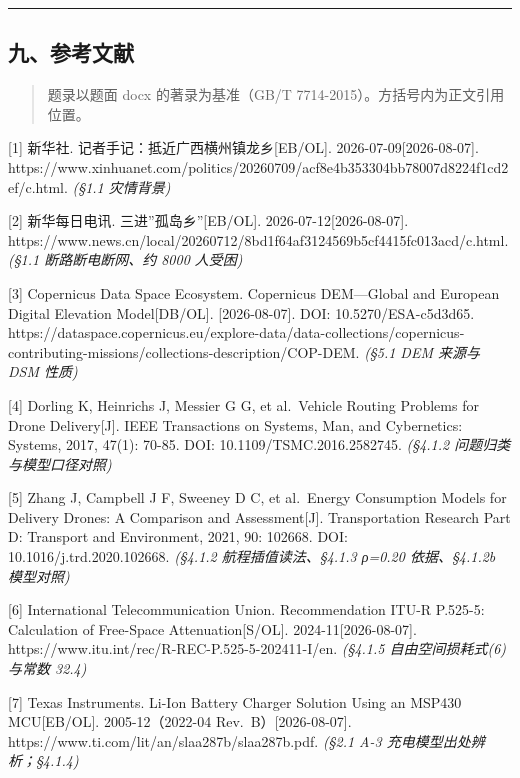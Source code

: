\documentclass[
  10.5pt,
]{extarticle}
\begin{document}
\begin{center}\rule{0.5\linewidth}{0.5pt}\end{center}

\subsection{九、参考文献}\label{ux4e5dux53c2ux8003ux6587ux732e}

\begin{quote}
题录以题面 docx 的著录为基准（GB/T 7714-2015）。方括号内为正文引用位置。
\end{quote}

{[}1{]} 新华社. 记者手记：抵近广西横州镇龙乡{[}EB/OL{]}.
2026-07-09{[}2026-08-07{]}.
https://www.xinhuanet.com/politics/20260709/acf8e4b353304bb78007d8224f1cd2ef/c.html.
\emph{(§1.1 灾情背景)}

{[}2{]} 新华每日电讯. 三进''孤岛乡''{[}EB/OL{]}.
2026-07-12{[}2026-08-07{]}.
https://www.news.cn/local/20260712/8bd1f64af3124569b5cf4415fc013acd/c.html.
\emph{(§1.1 断路断电断网、约 8000 人受困)}

{[}3{]} Copernicus Data Space Ecosystem. Copernicus DEM---Global and
European Digital Elevation Model{[}DB/OL{]}. {[}2026-08-07{]}. DOI:
10.5270/ESA-c5d3d65.
https://dataspace.copernicus.eu/explore-data/data-collections/copernicus-contributing-missions/collections-description/COP-DEM.
\emph{(§5.1 DEM 来源与 DSM 性质)}

{[}4{]} Dorling K, Heinrichs J, Messier G G, et al.~Vehicle Routing
Problems for Drone Delivery{[}J{]}. IEEE Transactions on Systems, Man,
and Cybernetics: Systems, 2017, 47(1): 70-85. DOI:
10.1109/TSMC.2016.2582745. \emph{(§4.1.2 问题归类与模型口径对照)}

{[}5{]} Zhang J, Campbell J F, Sweeney D C, et al.~Energy Consumption
Models for Delivery Drones: A Comparison and Assessment{[}J{]}.
Transportation Research Part D: Transport and Environment, 2021, 90:
102668. DOI: 10.1016/j.trd.2020.102668. \emph{(§4.1.2
航程插值读法、§4.1.3 ρ=0.20 依据、§4.1.2b 模型对照)}

{[}6{]} International Telecommunication Union. Recommendation ITU-R
P.525-5: Calculation of Free-Space Attenuation{[}S/OL{]}.
2024-11{[}2026-08-07{]}.
https://www.itu.int/rec/R-REC-P.525-5-202411-I/en. \emph{(§4.1.5
自由空间损耗式(6) 与常数 32.4)}

{[}7{]} Texas Instruments. Li-Ion Battery Charger Solution Using an
MSP430 MCU{[}EB/OL{]}. 2005-12（2022-04 Rev.~B）{[}2026-08-07{]}.
https://www.ti.com/lit/an/slaa287b/slaa287b.pdf. \emph{(§2.1 A-3
充电模型出处辨析；§4.1.4)}
\end{document}
